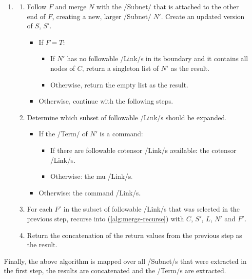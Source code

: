 \documentclass[12pt,a4paper]{article}
\begin{document}
\begin{enumerate}
    \item\label{alg:merge-recurse} \hfill \begin{enumerate}
        \item Follow $F$ and merge $N$ with the \hs/Subnet/ that is attached to the other end of $F$, creating a new, larger \hs/Subnet/ $N'$. Create an updated version of $S$, $S'$.\begin{itemize}
            \item If $F = T$:\begin{itemize}
                \item If $N'$ has no followable \hs/Link/s in its boundary and it contains all nodes of $C$, return a singleton list of $N'$ as the result.
                \item Otherwise, return the empty list as the result.
            \end{itemize}
            \item Otherwise, continue with the following steps.
        \end{itemize}
        \item\label{alg:expand-list} Determine which subset of followable \hs/Link/s should be expanded.\begin{itemize}
            \item If the \hs/Term/ of $N'$ is a command:\begin{itemize}
                \item If there are followable cotensor \hs/Link/s available: the co\-ten\-sor \hs/Link/s.
                \item Otherwise: the mu \hs/Link/s.
            \end{itemize}
            \item Otherwise: the command \hs/Link/s.
        \end{itemize}
        \item For each $F'$ in the subset of followable \hs/Link/s that was selected in the previous step, recurse into (\ref{alg:merge-recurse}) with $C$, $S'$, $L$, $N'$ and $F'$.
        \item Return the concatenation of the return values from the previous step as the result.
    \end{enumerate}
\end{enumerate}
Finally, the above algorithm is mapped over all \hs/Subnet/s that were extracted in the first step, the results are concatenated and the \hs/Term/s are extracted.
\end{document}
